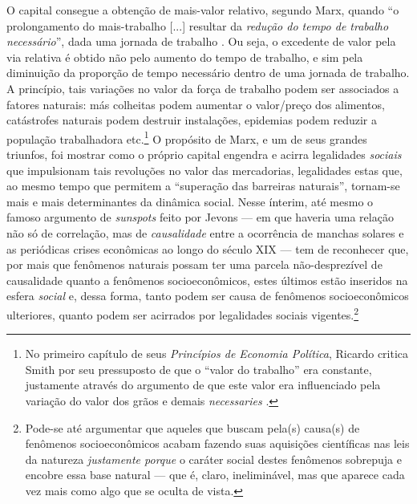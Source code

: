 O capital consegue a obtenção de mais-valor relativo, segundo Marx, quando ``o prolongamento do mais-trabalho [...] resultar da \textit{redução do tempo de trabalho necessário}'', dada uma jornada de trabalho \parencite[p. 389, grifo meu]{Marx2017}. Ou seja, o excedente de valor pela via relativa é obtido não pelo aumento do tempo de trabalho, e sim pela diminuição da proporção de tempo necessário dentro de uma jornada de trabalho. A princípio, tais variações no valor da força de trabalho podem ser associados a fatores naturais: más colheitas podem aumentar o valor/preço dos alimentos, catástrofes naturais podem destruir instalações, epidemias podem reduzir a população trabalhadora etc.\footnote{No primeiro capítulo de seus \textit{Princípios de Economia Política}, Ricardo critica Smith por seu pressuposto de que o ``valor do trabalho'' era constante, justamente através do argumento de que este valor era influenciado pela variação do valor dos grãos e demais \textit{necessaries} \parencite{Ricardo2005}.} O propósito de Marx, e um de seus grandes triunfos, foi mostrar como o próprio capital engendra e acirra legalidades \textit{sociais} que impulsionam tais revoluções no valor das mercadorias, legalidades estas que, ao mesmo tempo que permitem a ``superação das barreiras naturais'', tornam-se mais e mais determinantes da dinâmica social. Nesse ínterim, até mesmo o famoso argumento de \textit{sunspots} feito por Jevons --- em que haveria uma relação não só de correlação, mas de \textit{causalidade} entre a ocorrência de manchas solares e as periódicas crises econômicas ao longo do século XIX \parencite{Jevons1878} --- tem de reconhecer que, por mais que fenômenos naturais possam ter uma parcela não-desprezível de causalidade quanto a fenômenos socioeconômicos, estes últimos estão inseridos na esfera \textit{social} e, dessa forma, tanto podem ser causa de fenômenos socioeconômicos ulteriores, quanto podem ser acirrados por legalidades sociais vigentes.\footnote{Pode-se até argumentar que aqueles que buscam pela(s) causa(s) de fenômenos socioeconômicos acabam fazendo suas aquisições científicas nas leis da natureza \textit{justamente porque} o caráter social destes fenômenos sobrepuja e encobre essa base natural --- que é, claro, ineliminável, mas que aparece cada vez mais como algo que se oculta de vista.} 


